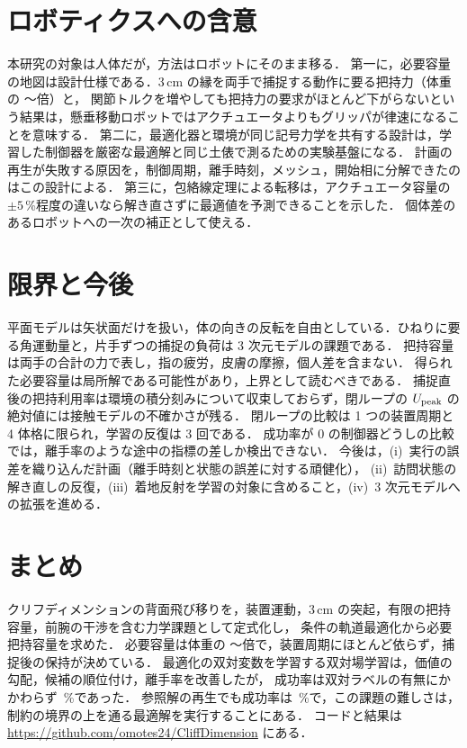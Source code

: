\section{ロボティクスへの含意}
\label{sec:robotics}
本研究の対象は人体だが，方法はロボットにそのまま移る．
第一に，必要容量の地図は設計仕様である．3\,cm の縁を両手で捕捉する動作に要る把持力（体重の \capBWmin〜\capBWmax 倍）と，
関節トルクを増やしても把持力の要求がほとんど下がらないという結果は，懸垂移動ロボットではアクチュエータよりもグリッパが律速になることを意味する．
第二に，最適化器と環境が同じ記号力学を共有する設計は，学習した制御器を厳密な最適解と同じ土俵で測るための実験基盤になる．
計画の再生が失敗する原因を，制御周期，離手時刻，メッシュ，開始相に分解できたのはこの設計による．
第三に，包絡線定理による転移は，アクチュエータ容量の $\pm5$\,\%程度の違いなら解き直さずに最適値を予測できることを示した．
個体差のあるロボットへの一次の補正として使える．

\section{限界と今後}
\label{sec:limits}
平面モデルは矢状面だけを扱い，体の向きの反転を自由としている．ひねりに要る角運動量と，片手ずつの捕捉の負荷は 3 次元モデルの課題である．
把持容量は両手の合計の力で表し，指の疲労，皮膚の摩擦，個人差を含まない．
得られた必要容量は局所解である可能性があり，上界として読むべきである．
捕捉直後の把持利用率は環境の積分刻みについて収束しておらず，閉ループの $U_{\mathrm{peak}}$ の絶対値には接触モデルの不確かさが残る．
閉ループの比較は 1 つの装置周期と 4 体格に限られ，学習の反復は 3 回である．
成功率が 0 の制御器どうしの比較では，離手率のような途中の指標の差しか検出できない．
今後は，(i)~実行の誤差を織り込んだ計画（離手時刻と状態の誤差に対する頑健化），
(ii)~訪問状態の解き直しの反復，(iii)~着地反射を学習の対象に含めること，(iv)~3 次元モデルへの拡張を進める．

\section{まとめ}
クリフディメンションの背面飛び移りを，装置運動，3\,cm の突起，有限の把持容量，前腕の干渉を含む力学課題として定式化し，
\gridN 条件の軌道最適化から必要把持容量を求めた．
必要容量は体重の \capBWmin〜\capBWmax 倍で，装置周期にほとんど依らず，捕捉後の保持が決めている．
最適化の双対変数を学習する双対場学習は，価値の勾配，候補の順位付け，離手率を改善したが，
成功率は双対ラベルの有無にかかわらず \clSmpcSuccInt\,\%であった．
参照解の再生でも成功率は \clReplaySuccInt\,\%で，この課題の難しさは，制約の境界の上を通る最適解を実行することにある．
コードと結果は \url{https://github.com/omotes24/CliffDimension} にある．

